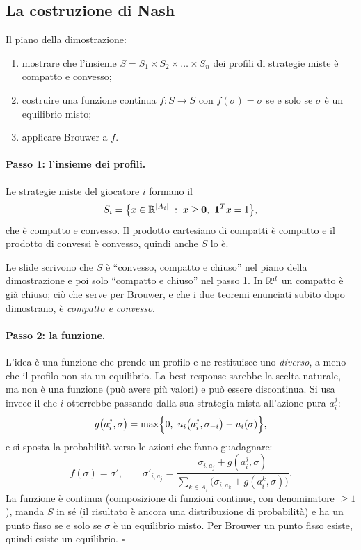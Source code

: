 \subsection{La costruzione di Nash}

Il piano della dimostrazione:
\begin{enumerate}
  \item mostrare che l'insieme $S = S_1 \times S_2 \times \dots \times S_n$ dei profili di
        strategie miste è compatto e convesso;
  \item costruire una funzione continua $f : S \to S$ con $f(\sigma) = \sigma$ se e solo se
        $\sigma$ è un equilibrio misto;
  \item applicare Brouwer a $f$.
\end{enumerate}

\paragraph{Passo 1: l'insieme dei profili.}
Le strategie miste del giocatore $i$ formano il 
\[
  S_i = \bigl\{ x \in \mathbb{R}^{|A_i|} \;:\; x \ge \mathbf{0},\ \mathbf{1}^T x = 1 \bigr\},
\]
che è compatto e convesso. Il prodotto cartesiano di compatti è compatto e il prodotto di
convessi è convesso, quindi anche $S$ lo è.

\begin{attenzione}
Le slide scrivono che $S$ è ``convesso, compatto e chiuso'' nel piano della dimostrazione e
poi solo ``compatto e chiuso'' nel passo 1. In $\mathbb{R}^d$ un compatto è già chiuso; ciò che
serve per Brouwer, e che i due teoremi enunciati subito dopo dimostrano, è
\emph{compatto e convesso}.
\end{attenzione}

\paragraph{Passo 2: la funzione.}
L'idea è una funzione che prende un profilo e ne restituisce uno \emph{diverso}, a meno che
il profilo non sia un equilibrio. La best response sarebbe la scelta naturale, ma non è una
funzione (può avere più valori) e può essere discontinua. Si usa invece il 
che $i$ otterrebbe passando dalla sua strategia mista all'azione pura $a_i^j$:
\[
  g\bigl(a_i^j, \sigma\bigr) = \max\Bigl\{0,\ u_i\bigl(a_i^j, \sigma_{-i}\bigr) - u_i(\sigma)\Bigr\},
\]
e si sposta la probabilità verso le azioni che fanno guadagnare:
\[
  f(\sigma) = \sigma', \qquad
  \sigma'_{i,a_j} = \frac{\sigma_{i,a_j} + g(a_i^j, \sigma)}
                         {\sum_{k \in A_i} \bigl(\sigma_{i,a_k} + g(a_i^k, \sigma)\bigr)} .
\]
La funzione è continua (composizione di funzioni continue, con denominatore $\ge 1$), manda
$S$ in sé (il risultato è ancora una distribuzione di probabilità) e ha un punto fisso se e
solo se $\sigma$ è un equilibrio misto. Per Brouwer un punto fisso esiste, quindi esiste un
equilibrio. $\square$

